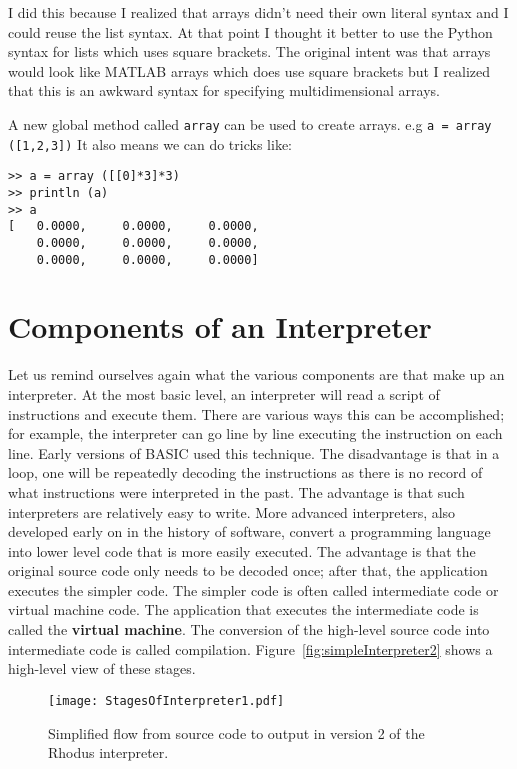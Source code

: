 I did this because I realized that arrays didn't need their own literal syntax and I could reuse the list syntax. At that point I thought it better to use the Python syntax for lists which uses square brackets. The original intent was that arrays would look like MATLAB arrays which does use square brackets but I realized that this is an awkward syntax for specifying multidimensional arrays.

A new global method called {\tt array} can be used to create arrays. e.g {\tt a = array ([1,2,3])} It also means we can do tricks like:

\begin{lstlisting}
>> a = array ([[0]*3]*3)
>> println (a)
>> a
[   0.0000,     0.0000,     0.0000,
    0.0000,     0.0000,     0.0000,
    0.0000,     0.0000,     0.0000]
\end{lstlisting}


\section{Components of an Interpreter}

Let us remind ourselves again what the various components are that make up an interpreter. At the most basic level, an interpreter will read a script of instructions and execute them. There are various ways this can be accomplished; for example, the interpreter can go line by line executing the instruction on each line. Early versions of BASIC used this technique. The disadvantage is that in a loop, one will be repeatedly decoding the instructions as there is no record of what instructions were interpreted in the past. The advantage is that such interpreters are relatively easy to write. More advanced interpreters, also developed early on in the history of software, convert a programming language into lower level code that is more easily executed. The advantage is that the original source code only needs to be decoded once; after that, the application executes the simpler code. The simpler code is often called intermediate code or virtual machine code. The application that executes the intermediate code is called the {\bf virtual machine}. The conversion of the high-level source code into intermediate code is called compilation. Figure~\ref{fig:simpleInterpreter2} shows a high-level view of these stages.

\begin{figure}[htpb]
\centering
\texttt{[image: StagesOfInterpreter1.pdf]}
\caption{Simplified flow from source code to output in version 2 of the Rhodus interpreter.}
\label{fig:simpleInterpreter1}
\end{figure}

